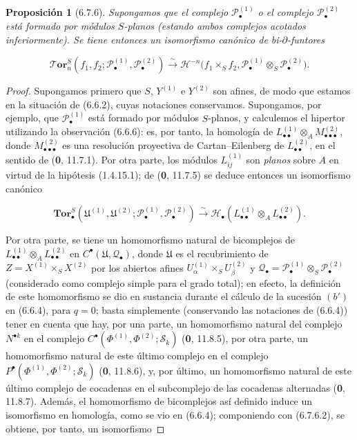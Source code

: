 \documentclass[10pt,oneside,openany]{book}
\theoremstyle{egaenv}\newtheorem*{env}{---}
\theoremstyle{egastatement}
\newtheorem*{proposition}{Proposición}
\theoremstyle{egadescription}
\newcommand{\oldpage}[2][]{\marginnote{\normalfont\scriptsize\textbf{#1}\,|\,#2}\ignorespaces}
\begin{document}
\begin{proposition}[6.7.6]
\label{III.6.7.6}
Supongamos que el complejo $\mathscr P_\bullet^{(1)}$ o el complejo
$\mathscr P_\bullet^{(2)}$ está formado por módulos $S$-planos (estando ambos
complejos acotados inferiormente). Se tiene entonces un isomorfismo canónico
de bi-$\partial$-funtores

\label{III.6.7.6.1}
\[
  \boldsymbol{\mathscr{T}\!or}_n^S
  (f_1,f_2;\mathscr P_\bullet^{(1)},\mathscr P_\bullet^{(2)})
  \xrightarrow{\sim}
  \mathcal H^{-n}\bigl(f_1\times_S f_2,
    \mathscr P_\bullet^{(1)}\otimes_S\mathscr P_\bullet^{(2)}\bigr).
  \tag{6.7.6.1}\label{III.6.7.6.1.fr}
\]

\end{proposition}

\begin{proof}
Supongamos primero que $S$, $Y^{(1)}$ e $Y^{(2)}$ son afines, de modo que
estamos en la situación de (6.6.2), cuyas notaciones conservamos. Supongamos,
por ejemplo, que $\mathscr P_\bullet^{(1)}$ está formado por módulos
$S$-planos, y calculemos el hipertor utilizando la observación (6.6.6): es,
por tanto, la homología de
$L_{\bullet\bullet}^{(1)}\otimes_A M_{\bullet\bullet\bullet}^{(2)}$, donde
$M_{\bullet\bullet\bullet}^{(2)}$ es una resolución proyectiva de
Cartan--Eilenberg de $L_{\bullet\bullet}^{(2)}$, en el sentido de
(\textbf{0}, 11.7.1). Por otra parte, los módulos
$L_{ij}^{(1)}$ son \emph{planos} sobre $A$ en virtud de la hipótesis
(1.4.15.1); de (\textbf{0}, 11.7.5) se deduce entonces un isomorfismo
canónico

\label{III.6.7.6.2}
\[
  \mathbf{Tor}_\bullet^S
  (\mathfrak U^{(1)},\mathfrak U^{(2)};
   \mathscr P_\bullet^{(1)},\mathscr P_\bullet^{(2)})
  \xrightarrow{\sim}
  \mathscr H_\bullet
  (L_{\bullet\bullet}^{(1)}\otimes_A L_{\bullet\bullet}^{(2)}).
  \tag{6.7.6.2}\label{III.6.7.6.2.fr}
\]

Por otra parte, se tiene un homomorfismo natural de bicomplejos de
$L_{\bullet\bullet}^{(1)}\otimes_A L_{\bullet\bullet}^{(2)}$ en
$C^\bullet(\mathfrak U,\mathscr Q_\bullet)$, donde $\mathfrak U$ es el
recubrimiento de $Z=X^{(1)}\times_S X^{(2)}$ por los abiertos afines
\oldpage[III]{161}
$U_\alpha^{(1)}\times_S U_\beta^{(2)}$ y
$\mathscr Q_\bullet
=\mathscr P_\bullet^{(1)}\otimes_S\mathscr P_\bullet^{(2)}$ (considerado como
complejo simple para el grado total); en efecto, la definición de este
homomorfismo se dio en sustancia durante el cálculo de la sucesión $(b')$ en
(6.6.4), para $q=0$; basta simplemente (conservando las notaciones de (6.6.4))
tener en cuenta que hay, por una parte, un homomorfismo natural del complejo
$N^{\bullet k}$ en el complejo
$C^\bullet(\Phi^{(1)},\Phi^{(2)};\mathscr S_k)$
(\textbf{0}, 11.8.5), por otra parte, un homomorfismo natural de este
último complejo en el complejo
$P^\bullet(\Phi^{(1)},\Phi^{(2)};\mathscr S_k)$
(\textbf{0}, 11.8.6), y, por último, un homomorfismo natural de este
último complejo de cocadenas en el subcomplejo de las cocadenas alternadas
(\textbf{0}, 11.8.7). Además, el homomorfismo de bicomplejos así definido
induce un isomorfismo en homología, como se vio en (6.6.4); componiendo con
(6.7.6.2), se obtiene, por tanto, un isomorfismo


\end{proof}
\end{document}
